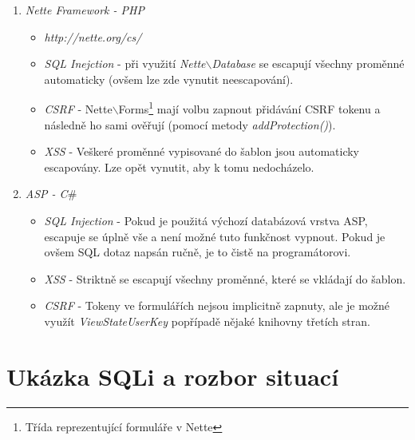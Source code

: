\documentclass[12pt, a4paper]{report}
\begin{document}
\begin{enumerate}
\begin{itemize}
\begin{itemize}
\item RAW queries - neescapují vůbec
\end{itemize}
\item \textit{CSRF} - Django obsahuje \textit{middleware}\footnote{Middleware je tzv. , v tomto případě mezi jádrem DJanga a naší aplikací.}, který nám umožní přidávat CSRF token k formulářům a následně ho ověřovat: - víc e informcí na: \textit{https://docs.djangoproject.com/en/dev/ref/contrib/csrf/}.
\item \textit{XSS} - Šablony DJanga automaticky escapují proměnné, ale ne všechny (více informací na: \textit{https://docs.djangoproject.com/en/ dev/topics/security/}).
\end{itemize}
\item \textit{Nette Framework - PHP}
\begin{itemize}
\item \textit{http://nette.org/cs/}
\item \textit{SQL Inejction}  - při využití \textit{Nette$\backslash$Database} se escapují všechny proměnné automaticky (ovšem lze zde vynutit neescapování).
\item \textit{CSRF} - Nette$\backslash$Forms\footnote{Třída reprezentující formuláře v Nette} mají volbu zapnout přidávání CSRF tokenu a následně ho sami ověřují (pomocí metody \textit{addProtection()}).
\item \textit{XSS} - Veškeré proměnné vypisované do šablon jsou automaticky escapovány. Lze opět vynutit, aby k tomu nedocházelo.
\end{itemize}
 
\item \textit{ASP - C$\#$}
\begin{itemize}
\item \textit{SQL Injection} - Pokud je použitá výchozí databázová vrstva ASP, escapuje se úplně vše a není možné tuto funkčnost vypnout. Pokud je ovšem SQL dotaz napsán ručně, je to čistě na programátorovi.
\item \textit{XSS} - Striktně se escapují všechny proměnné, které se vkládají do šablon.
\item \textit{CSRF} - Tokeny ve formulářích nejsou implicitně zapnuty, ale je možné využít \textit{ViewStateUserKey} popřípadě nějaké knihovny třetích stran.
\end{itemize}
\end{enumerate}

\chapter{Ukázka SQLi a rozbor situací}
\end{document}
